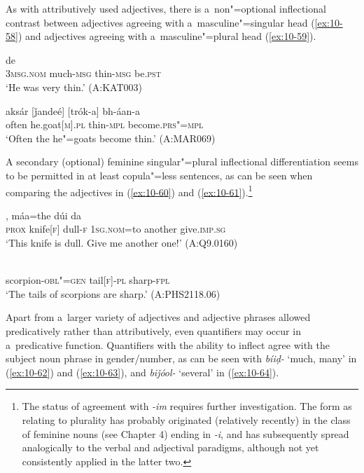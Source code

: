 As with attributively used adjectives, there is a~non"=optional inflectional contrast between adjectives agreeing with a~masculine"=singular head (\ref{ex:10-58}) and adjectives agreeing with a~masculine"=plural head (\ref{ex:10-59}).

\begin{exe}
\ex
\label{ex:10-58}
 de \\
\textsc{3msg.nom} much-\textsc{msg} thin-\textsc{msg} be.\textsc{pst} \\
\glt `He was very thin.' (A:KAT003)

\ex
\label{ex:10-59}
\gll aksár [ǰandeé] [trók-a] bh-áan-a \\
often he.goat[\textsc{m}].\textsc{pl} thin-\textsc{mpl} become.\textsc{prs"=mpl} \\
\glt `Often the he"=goats become thin.' (A:MAR069)
\end{exe}


A secondary (optional) feminine singular"=plural inflectional differentiation seems to be permitted in at least copula"=less sentences, as can be seen when comparing the adjectives in (\ref{ex:10-60}) and (\ref{ex:10-61}).\footnote{The status of agreement with \textit{-im} requires further investigation. The form as relating to plurality has probably originated (relatively recently) in the class of feminine nouns (see Chapter 4) ending in \textit{-i}, and has subsequently spread analogically to the verbal and adjectival paradigms, although not yet consistently applied in the latter two.}

\begin{exe}
\ex
\label{ex:10-60}
, máa=the dúi da \\
\textsc{prox} knife[\textsc{f}] dull-\textsc{f} \textsc{1sg.nom=}to another give.\textsc{imp.sg} \\
\glt `This knife is dull. Give me another one!' (A:Q9.0160)

\ex
\label{ex:10-61}
\gll [ṭíinčuk"=am-i laméeṭi-m] [tíiṇ-im] \\ 
scorpion-\textsc{obl"=gen} tail[\textsc{f}]-\textsc{pl } sharp-\textsc{fpl} \\
\glt `The tails of scorpions are sharp.' (A:PHS2118.06)
\end{exe}

Apart from a~larger variety of adjectives and adjective phrases allowed predicatively rather than attributively, even quantifiers may occur in a~predicative function. Quantifiers with the ability to inflect agree with the subject noun phrase in gender/number, as can be seen with \textit{bíiḍ-} `much, many' in (\ref{ex:10-62}) and (\ref{ex:10-63}), and \textit{biǰóol-} `several' in (\ref{ex:10-64}).

